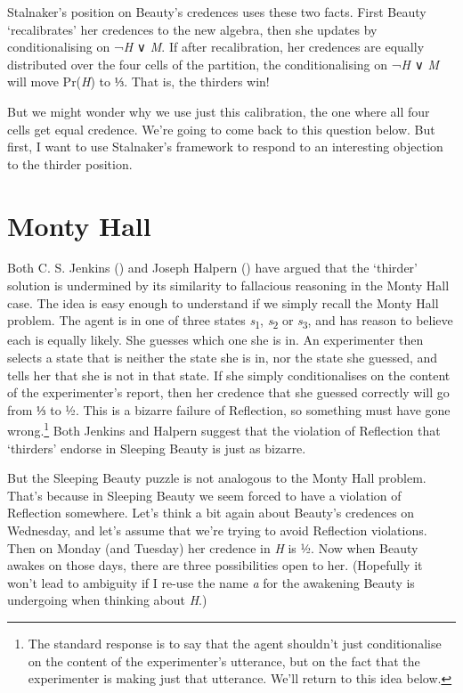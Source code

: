 \documentclass[
  10pt,
  letterpaper,
  DIV=11,
  numbers=noendperiod,
  twoside]{scrartcl}
\begin{document}
Stalnaker's position on Beauty's credences uses these two facts. First
Beauty `recalibrates' her credences to the new algebra, then she updates
by conditionalising on ¬\emph{H} ∨ \emph{M}. If after recalibration, her
credences are equally distributed over the four cells of the partition,
the conditionalising on ¬\emph{H} ∨ \emph{M} will move Pr(\emph{H}) to
⅓. That is, the thirders win!

But we might wonder why we use just this calibration, the one where all
four cells get equal credence. We're going to come back to this question
below. But first, I want to use Stalnaker's framework to respond to an
interesting objection to the thirder position.

\section{Monty Hall}\label{monty-hall}

Both C. S. Jenkins () and Joseph Halpern
() have argued that the `thirder'
solution is undermined by its similarity to fallacious reasoning in the
Monty Hall case. The idea is easy enough to understand if we simply
recall the Monty Hall problem. The agent is in one of three states
\emph{s}\textsubscript{1}, \emph{s}\textsubscript{2} or
\emph{s}\textsubscript{3}, and has reason to believe each is equally
likely. She guesses which one she is in. An experimenter then selects a
state that is neither the state she is in, nor the state she guessed,
and tells her that she is not in that state. If she simply
conditionalises on the content of the experimenter's report, then her
credence that she guessed correctly will go from ⅓ to ½. This is a
bizarre failure of Reflection, so something must have gone
wrong.\footnote{The standard response is to say that the agent shouldn't
  just conditionalise on the content of the experimenter's utterance,
  but on the fact that the experimenter is making just that utterance.
  We'll return to this idea below.} Both Jenkins and Halpern suggest
that the violation of Reflection that `thirders' endorse in Sleeping
Beauty is just as bizarre.

But the Sleeping Beauty puzzle is not analogous to the Monty Hall
problem. That's because in Sleeping Beauty we seem forced to have a
violation of Reflection somewhere. Let's think a bit again about
Beauty's credences on Wednesday, and let's assume that we're trying to
avoid Reflection violations. Then on Monday (and Tuesday) her credence
in \emph{H} is ½. Now when Beauty awakes on those days, there are three
possibilities open to her. (Hopefully it won't lead to ambiguity if I
re-use the name \emph{a} for the awakening Beauty is undergoing when
thinking about \emph{H}.)
\end{document}

